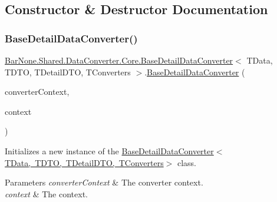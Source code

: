 \subsection{Constructor \& Destructor Documentation}
\mbox{\label{class_bar_none_1_1_shared_1_1_data_converter_1_1_core_1_1_base_detail_data_converter_ac8321389de60b0bbc79c12d167c2d95f}} 
\subsubsection{\texorpdfstring{Base\+Detail\+Data\+Converter()}{BaseDetailDataConverter()}}
{\footnotesize\ttfamily \mbox{\hyperlink{class_bar_none_1_1_shared_1_1_data_converter_1_1_core_1_1_base_detail_data_converter}{Bar\+None.\+Shared.\+Data\+Converter.\+Core.\+Base\+Detail\+Data\+Converter}}$<$ T\+Data, T\+D\+TO, T\+Detail\+D\+TO, T\+Converters $>$.\mbox{\hyperlink{class_bar_none_1_1_shared_1_1_data_converter_1_1_core_1_1_base_detail_data_converter}{Base\+Detail\+Data\+Converter}} (\begin{DoxyParamCaption}\item[{T\+Converters}]{converter\+Context,  }\item[{\mbox{\hyperlink{interface_bar_none_1_1_shared_1_1_core_1_1_i_domain_context}{I\+Domain\+Context}}}]{context }\end{DoxyParamCaption})}



Initializes a new instance of the \mbox{\hyperlink{class_bar_none_1_1_shared_1_1_data_converter_1_1_core_1_1_base_detail_data_converter_ac8321389de60b0bbc79c12d167c2d95f}{Base\+Detail\+Data\+Converter$<$\+T\+Data, T\+D\+T\+O, T\+Detail\+D\+T\+O, T\+Converters$>$}} class. 


\begin{DoxyParams}{Parameters}
{\em converter\+Context} & The converter context.\\
\hline
{\em context} & The context.\\
\hline
\end{DoxyParams}



